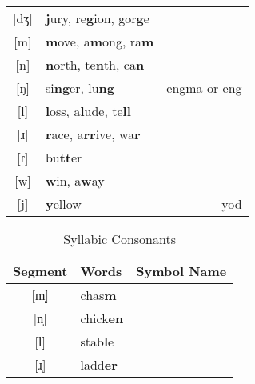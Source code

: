 \documentclass{article}
\begin{document}
\begin{table}[htb]
\begin{tabular}{c | l r}
      {[}dʒ{]} & \textbf{j}ury, re\textbf{g}ion, gor\textbf{g}e     & \\
      {[}m{]}  & \textbf{m}ove, a\textbf{m}ong, ra\textbf{m}        & \\
      {[}n{]}  & \textbf{n}orth, te\textbf{n}th, ca\textbf{n}       & \\
      {[}ŋ{]}  & si\textbf{ng}er, lu\textbf{ng}                     & engma or eng \\
      {[}l{]}  & \textbf{l}oss, a\textbf{l}ude, te\textbf{ll}       & \\
      {[}ɹ{]}  & \textbf{r}ace, a\textbf{rr}ive, wa\textbf{r}       & \\
      {[}ɾ{]}  & bu\textbf{tt}er                                    & \\
      {[}w{]}  & \textbf{w}in, a\textbf{w}ay                        & \\
      {[}j{]}  & \textbf{y}ellow                                    & yod
    \end{tabular}
  \end{table}

  \begin{table}[tb]
    \caption{Syllabic Consonants}
    \centering
    \vspace{0.5cm}
    \begin{tabular}{c | l r}
      Segment & Words & Symbol Name \\
      \hline
      {[}m̩{]} & chas\textbf{m}   & \\
      {[}n̩{]} & chick\textbf{en} & \\
      {[}l̩{]} & stab\textbf{l}e  & \\
      {[}ɹ̩{]} & ladd\textbf{er}  &
    \end{tabular}
  \end{table}
\end{document}
